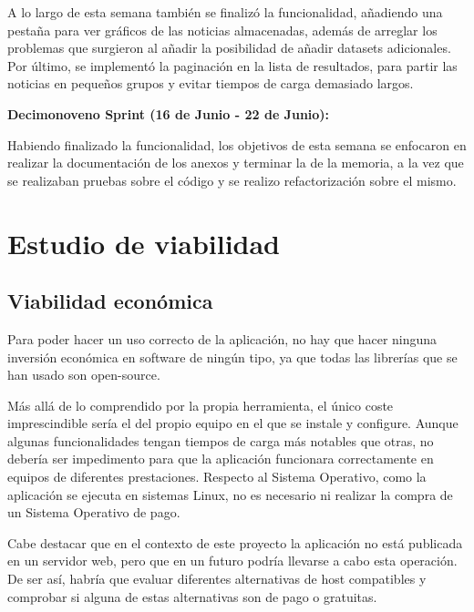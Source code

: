 A lo largo de esta semana también se finalizó la funcionalidad, añadiendo una pestaña para ver gráficos de las noticias almacenadas, además de arreglar los problemas que surgieron al añadir la posibilidad de añadir datasets adicionales. Por último, se implementó la paginación en la lista de resultados, para partir las noticias en pequeños grupos y evitar tiempos de carga demasiado largos.



\textbf{Decimonoveno Sprint (16 de Junio - 22 de Junio):}

Habiendo finalizado la funcionalidad, los objetivos de esta semana se enfocaron en realizar la documentación de los anexos y terminar la de la memoria, a la vez que se realizaban pruebas sobre el código y se realizo refactorización sobre el mismo.


\section{Estudio de viabilidad}

\subsection{Viabilidad económica}

Para poder hacer un uso correcto de la aplicación, no hay que hacer ninguna inversión económica en software de ningún tipo, ya que todas las librerías que se han usado son open-source.

Más allá de lo comprendido por la propia herramienta, el único coste imprescindible sería el del propio equipo en el que se instale y configure. Aunque algunas funcionalidades tengan tiempos de carga más notables que otras, no debería ser impedimento para que la aplicación funcionara correctamente en equipos de diferentes prestaciones. Respecto al Sistema Operativo, como la aplicación se ejecuta en sistemas Linux, no es necesario ni realizar la compra de un Sistema Operativo de pago.

Cabe destacar que en el contexto de este proyecto la aplicación no está publicada en un servidor web, pero que en un futuro podría llevarse a cabo esta operación. De ser así, habría que evaluar diferentes alternativas de host compatibles y comprobar si alguna de estas alternativas son de pago o gratuitas.

